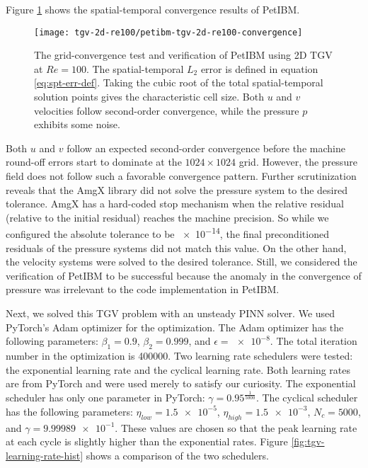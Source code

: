 Figure \ref{fig:tgv-petibm-convergence} shows the spatial-temporal convergence results of PetIBM.
\begin{figure}
    \centering%
    \texttt{[image: tgv-2d-re100/petibm-tgv-2d-re100-convergence]}%
    \caption{%
        The grid-convergence test and verification of PetIBM using 2D TGV at $Re=\num{100}$.
        The spatial-temporal $L_2$ error is defined in equation \eqref{eq:spt-err-def}.
        Taking the cubic root of the total spatial-temporal solution points gives the characteristic cell size.
        Both $u$ and $v$ velocities follow second-order convergence, while the pressure $p$ exhibits some noise.
    }
    \label{fig:tgv-petibm-convergence}%
\end{figure}
Both $u$ and $v$ follow an expected second-order convergence before the machine round-off errors start to dominate at the $1024 \times 1024$ grid.
However, the pressure field does not follow such a favorable convergence pattern.
Further scrutinization reveals that the AmgX library did not solve the pressure system to the desired tolerance.
AmgX has a hard-coded stop mechanism when the relative residual (relative to the initial residual) reaches the machine precision.
So while we configured the absolute tolerance to be \num{e-14}, the final preconditioned residuals of the pressure systems did not match this value.
On the other hand, the velocity systems were solved to the desired tolerance.
Still, we considered the verification of PetIBM to be successful because the anomaly in the convergence of pressure was irrelevant to the code implementation in PetIBM.

Next, we solved this TGV problem with an unsteady PINN solver.
We used PyTorch's Adam optimizer for the optimization.
The Adam optimizer has the following parameters: $\beta_1=\num{0.9}$, $\beta_2=\num{0.999}$, and $\epsilon=\num{e-8}$.
The total iteration number in the optimization is \num{400000}.
Two learning rate schedulers were tested: the exponential learning rate and the cyclical learning rate.
Both learning rates are from PyTorch and were used merely to satisfy our curiosity.
The exponential scheduler has only one parameter in PyTorch: $\gamma=0.95^{\frac{1}{5000}}$.
The cyclical scheduler has the following parameters: $\eta_{low}=\num{1.5e-5}$, $\eta_{high}=\num{1.5e-3}$, $N_c=\num{5000}$, and $\gamma=\num{9.99989e-1}$.
These values are chosen so that the peak learning rate at each cycle is slightly higher than the exponential rates.
Figure \ref{fig:tgv-learning-rate-hist} shows a comparison of the two schedulers.


